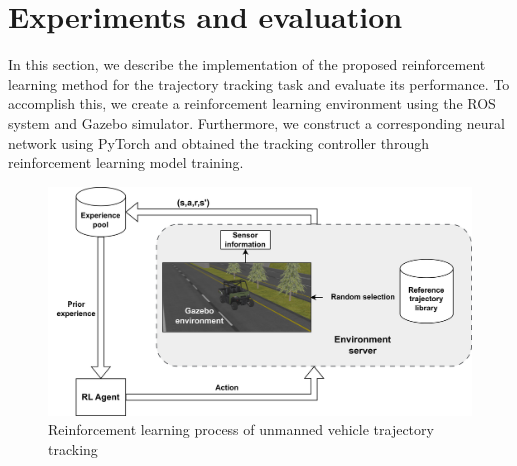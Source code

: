 \documentclass[sn-mathphys]{sn-jnl}%
\theoremstyle{thmstyleone}%
\theoremstyle{thmstyletwo}%
\theoremstyle{thmstylethree}%
\begin{document}
\section{Experiments and evaluation}\label{subsubsec2}

In this section, we describe the implementation of the proposed reinforcement learning method for the trajectory tracking task and evaluate its performance. To accomplish this, we create a reinforcement learning environment using the ROS system and Gazebo simulator\cite{1389727}. Furthermore, we construct a corresponding neural network using PyTorch and obtained the tracking controller through reinforcement learning model training.


\begin{figure}
	\centering
	\includegraphics[width=0.9\linewidth]{rl_process2}
	\caption{Reinforcement learning process of unmanned vehicle trajectory tracking}
	\label{fig:rl process}
\end{figure}
\end{document}
